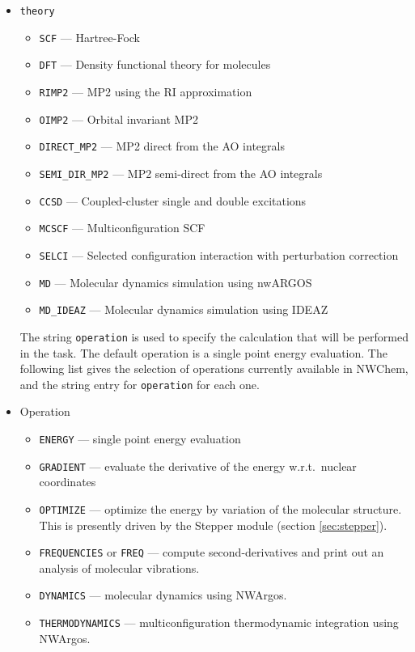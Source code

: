 \begin{itemize}
\item \verb+theory+ \newline
\begin{itemize}
 \item \verb+SCF+ --- Hartree-Fock
 \item \verb+DFT+ --- Density functional theory for molecules
 \item \verb+RIMP2+ --- MP2 using the RI approximation
 \item \verb+OIMP2+ --- Orbital invariant MP2
 \item \verb+DIRECT_MP2+ --- MP2 direct from the AO integrals
 \item \verb+SEMI_DIR_MP2+ --- MP2 semi-direct from the AO integrals
 \item \verb+CCSD+ --- Coupled-cluster single and double excitations
 \item \verb+MCSCF+ --- Multiconfiguration SCF
 \item \verb+SELCI+ --- Selected configuration interaction with perturbation
   correction 
 \item \verb+MD+ --- Molecular dynamics simulation using nwARGOS
 \item \verb+MD_IDEAZ+ --- Molecular dynamics simulation using IDEAZ
\end{itemize}

The string \verb+operation+ is used to specify the calculation that will
be performed in the task.  The default operation is a single point energy
evaluation.  The following list gives the selection of operations currently
available in NWChem, and the string entry for \verb+operation+ for each one.

\item Operation \newline
\begin{itemize}
 \item \verb+ENERGY+ --- single point energy evaluation
 \item \verb+GRADIENT+ --- evaluate the derivative of the energy w.r.t.\
   nuclear coordinates
 \item \verb+OPTIMIZE+ --- optimize the energy by variation of the molecular
   structure.  This is presently driven by the Stepper module
   (section \ref{sec:stepper}). 
 \item \verb+FREQUENCIES+ or \verb+FREQ+ --- compute second-derivatives and print
   out an analysis of molecular vibrations.
 \item \verb+DYNAMICS+ --- molecular dynamics using NWArgos.
 \item \verb+THERMODYNAMICS+ --- multiconfiguration thermodynamic integration
    using NWArgos.
\end{itemize} 
\end{itemize}

